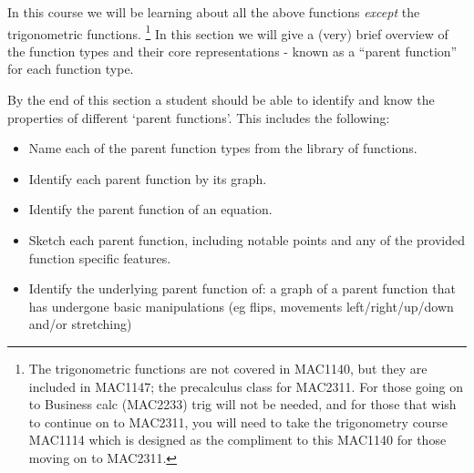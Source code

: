 \documentclass{ximera}
\begin{document}
    In this course we will be learning about all the above functions \textit{except} the trigonometric functions.%
    \footnote{
        The trigonometric functions are not covered in MAC1140, but they are included in MAC1147; the precalculus class for MAC2311. For those going on to Business calc (MAC2233) trig will not be needed, and for those that wish to continue on to MAC2311, you will need to take the trigonometry course MAC1114 which is designed as the compliment to this MAC1140 for those moving on to MAC2311.
        }
    In this section we will give a (very) brief overview of the function types and their core representations - known as a ``parent function'' for each function type.
    
    By the end of this section a student should be able to identify and know the properties of different `parent functions'. This includes the following:
    \begin{itemize}
        \item Name each of the parent function types from the library of functions.
        \item Identify each parent function by its graph.
        \item Identify the parent function of an equation.
        \item Sketch each parent function, including notable points and any of the provided function specific features.
        \item Identify the underlying parent function of: a graph of a parent function that has undergone basic manipulations (eg flips, movements left/right/up/down and/or stretching) 
    \end{itemize}
\end{document}
